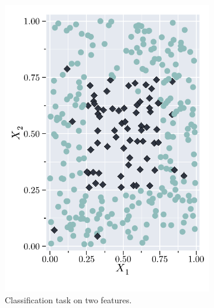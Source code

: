 \begin{figure}[h]
    \centering
    \begin{subfigure}[t]{0.45\textwidth}
        \centering
       \includegraphics[width=\textwidth]{img/tree_obs.pdf} 
       \caption{Classification task on two features.}
       \label{fig:classification-task}
    \end{subfigure}
    \begin{subfigure}[t]{0.45\textwidth}
        \centering

\end{subfigure}
\end{figure}
